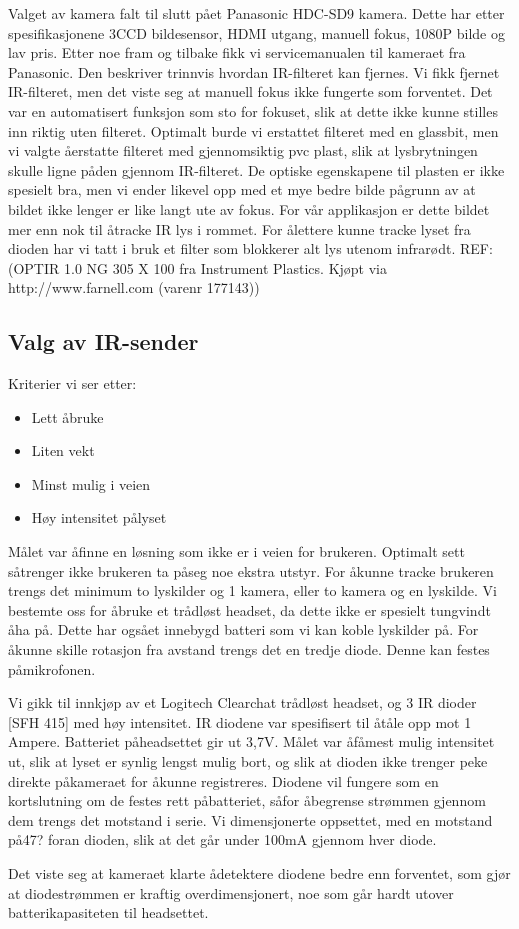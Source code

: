 		Valget av kamera falt til slutt p\aa et Panasonic HDC-SD9 kamera. Dette har etter spesifikasjonene 3CCD bildesensor, HDMI utgang, manuell fokus, 1080P bilde og lav pris. Etter noe fram og tilbake fikk vi servicemanualen til kameraet fra Panasonic. Den beskriver trinnvis hvordan IR-filteret kan fjernes. Vi fikk fjernet IR-filteret, men det viste seg at manuell fokus ikke fungerte som forventet. Det var en automatisert funksjon som sto for fokuset, slik at dette ikke kunne stilles inn riktig uten filteret. Optimalt burde vi erstattet filteret med en glassbit, men vi valgte \aa \space erstatte filteret med gjennomsiktig pvc plast, slik at lysbrytningen skulle ligne p\aa \space den gjennom IR-filteret. De optiske egenskapene til plasten er ikke spesielt bra, men vi ender likevel opp med et mye bedre bilde p\aa grunn av at bildet ikke lenger er like langt ute av fokus. For v\aa r applikasjon er dette bildet mer enn nok til \aa \space tracke IR lys i rommet. For \aa \space lettere kunne tracke lyset fra dioden har vi tatt i bruk et filter som blokkerer alt lys utenom infrar\o dt. REF: (OPTIR 1.0 NG 305 X 100 fra Instrument Plastics. Kj\o pt via http://www.farnell.com (varenr 177143))
		
	\subsection{Valg av IR-sender}
		
		Kriterier vi ser etter:
	
		\begin{itemize}
			\item Lett \aa \space bruke
			\item Liten vekt
			\item Minst mulig i veien
			\item H\o y intensitet p\aa lyset
		\end{itemize}

		M\aa let var \aa \space finne en l\o sning som ikke er i veien for brukeren. Optimalt sett s\aa trenger ikke brukeren ta p\aa \space seg noe ekstra utstyr. For \aa \space kunne tracke brukeren trengs det minimum to lyskilder og 1 kamera, eller to kamera og en lyskilde. Vi bestemte oss for \aa \space bruke et tr\aa dl\o st headset, da dette ikke er spesielt tungvindt \aa \space ha p\aa. Dette har ogs\aa et innebygd batteri som vi kan koble lyskilder p\aa . For \aa \space kunne skille rotasjon fra avstand trengs det en tredje diode. Denne kan festes p\aa \space mikrofonen.

		Vi gikk til innkj\o p av et Logitech Clearchat tr\aa dl\o st headset, og 3 IR dioder [SFH 415] med h\o y intensitet. IR diodene var spesifisert til \aa \space t\aa le opp mot 1 Ampere. Batteriet p\aa headsettet gir ut 3,7V. M\aa let var \aa \space f\aa \space mest mulig intensitet ut, slik at lyset er synlig lengst mulig bort, og slik at dioden ikke trenger peke direkte p\aa kameraet for \aa \space kunne registreres. Diodene vil fungere som en kortslutning om de festes rett p\aa batteriet, s\aa for \aa \space begrense str\o mmen gjennom dem trengs det motstand i serie. Vi dimensjonerte oppsettet, med en motstand p\aa 47? foran dioden, slik at det g\aa r under 100mA gjennom hver diode.

		Det viste seg at kameraet klarte \aa \space detektere diodene bedre enn forventet, som gj\o r at diodestr\o mmen er kraftig overdimensjonert, noe som g\aa r hardt utover batterikapasiteten til headsettet.